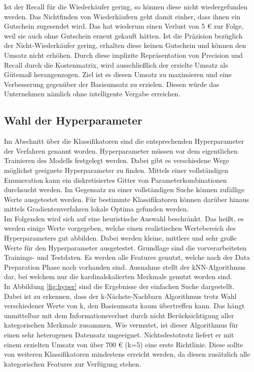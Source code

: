 Ist der Recall für die Wiederkäufer gering, so können diese nicht wiedergefunden werden. Das Nichtfinden von Wiederkäufern geht damit einher, dass ihnen ein Gutschein zugesendet wird. Das hat wiederum einen Verlust von 5 \euro{} zur Folge, weil sie auch ohne Gutschein erneut gekauft hätten. Ist die Präzision bezüglich der Nicht-Wiederkäufer gering, erhalten diese keinen Gutschein und können den Umsatz nicht erhöhen. Durch diese implizite Repräsentation von Precision und Recall durch die Kostenmatrix, wird ausschließlich der erzielte Umsatz als Gütemaß herangenzogen. Ziel ist es diesen Umsatz zu maximieren und eine Verbesserung gegenüber der Basisumsatz zu erzielen. Diesen würde das Unternehmen nämlich ohne intelligente Vergabe erreichen.


\subsection{Wahl der Hyperparameter}

Im Abschnitt über die Klassifikatoren sind die entsprechenden Hyperparameter der Verfahren genannt worden. Hyperparameter müssen vor dem eigentlichen Trainieren des Modells festgelegt werden. Dabei gibt es verschiedene Wege möglichst geeignete Hyperparameter zu finden. Mittels einer vollständigen Enumeration kann ein diskretisiertes Gitter von Parameterkombinationen durchsucht werden. Im Gegensatz zu einer vollständigen Suche können zufällige Werte ausgetestet werden. Für bestimmte Klassifikatoren können darüber hinaus mittels Gradientenverfahren lokale Optima gefunden werden.\\

Im Folgenden wird sich auf eine heuristische Auswahl beschränkt. Das heißt, es werden einige Werte vorgegeben, welche einen realistischen Wertebereich des Hyperparameters gut abbilden. Dabei werden kleine, mittlere und sehr große Werte für den Hyperparameter ausgetestet. Grundlage sind die vorverarbeiteten Trainings- und Testdaten. Es werden alle Features genutzt, welche nach der Data Preparation Phase noch vorhanden sind. Ausnahme stellt der kNN-Algorithmus dar, bei welchem nur die kardinalskalierten Merkmale genutzt worden sind.\\

In Abbildung \ref{fig:hyper} sind die Ergebnisse der einfachen Suche dargestellt. Dabei ist zu erkennen, dass der k-Nächste-Nachbarn Algorithmus trotz Wahl verschiedener Werte von k, den Basisumsatz kaum übertreffen kann. Das hängt unmittelbar mit dem Informationsverlust durch nicht Berücksichtigung aller kategorischen Merkmale zusammen. Wie vermutet, ist dieser Algorithmus für einen sehr heterogenen Datensatz ungeeignet. Nichtsdestotrotz liefert er mit einem erzielten Umsatz von über 700 \euro{} (k=5) eine erste Richtlinie. Diese sollte von weiteren Klassifikatoren mindestens erreicht werden, da diesen zusätzlich alle kategorischen Features zur Verfügung stehen.\\

